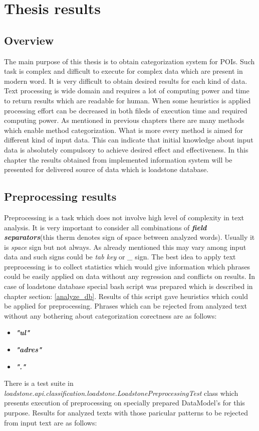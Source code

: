 \chapter{Thesis results}

\section{Overview}
The main purpose of this thesis is to obtain categorization system for POIs. Such task is complex and difficult to execute for complex data which are present in modern word. It is very difficult to obtain desired results for each kind of data. Text processing is wide domain and requires a lot of computing power and time to return results which are readable for human. When some heuristics is applied processing effort can be decreased in both fileds of execution time and required computing power. As mentioned in previous chapters there are many methods which enable method categorization. What is more every method is aimed for different kind of input data. This can indicate that initial knowledge about input data is absolutely compulsory to achieve desired effect and effectiveness. In this chapter the results obtained from implemented information system will be presented for delivered source of data which is loadstone database.

\section{Preprocessing results}
Preprocessing is a task which does not involve high level of complexity in text analysis. It is very important to consider all combinations of \textit{\textbf{field separators}}(this therm denotes sign of space between analyzed words). Usually it is \textit{space} sign but not always. As already mentioned this may vary among input data and such signs could be \textit{tab key} or \textit{\_} sign. The best idea to apply text preprocessing is to collect statistics which would give information which phrases could be easily applied on data without any regression and conflicts on results. In case of loadstone database special bash script was prepared which is described in chapter section: \ref{analyze_db}. Results of this script gave heuristics which could be applied for preprocessing. Phrases which can be rejected from analyzed text without any bothering about categorization corectness are as follows:
\newline
\begin{itemize}
	\item \textbf{\textit{"ul"}}
	\item \textbf{\textit{"adres"}}
	\item \textbf{\textit{"."}}
\end{itemize}
There is a test suite in \textit{loadstone.api.classification.loadstone.LoadstonePreprocessingTest} class which presents execution of preprocessing on specially prepared DataModel's for this purpose. Results for analyzed texts with those paricular patterns to be rejected from input text are as follows:

